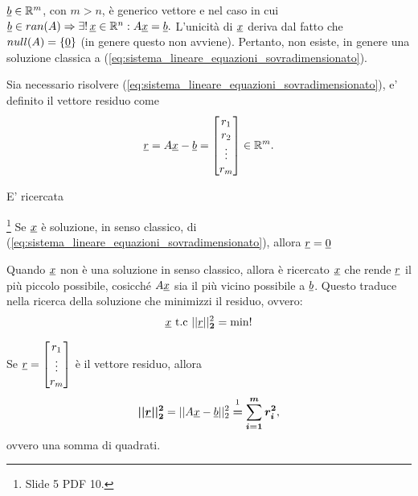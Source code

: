 $\uline b\in\mathbb R^m$, con $m>n$, è generico vettore e nel caso in cui $\uline b\in ran(A)\Rightarrow\exists! \,\uline x\in\mathbb R^n:A\uline x=\uline b.$ L'unicità di $\uline x$ deriva dal fatto che $null(A)=\{\uline 0\}$ (in genere questo non avviene). Pertanto, non esiste, in genere una soluzione classica a (\ref{eq:sistema_lineare_equazioni_sovradimensionato}).

\begin{definition}
	Sia necessario risolvere (\ref{eq:sistema_lineare_equazioni_sovradimensionato}), e' definito il vettore residuo come
	\begin{equation}\label{eq:vettore_residuo}
		\uline r = A\uline x-\uline b=
		\begin{bmatrix}
			r_1\\
			r_2\\
			\vdots\\
			r_m
		\end{bmatrix}
		\in\mathbb R^m.
	\end{equation}
\end{definition}

E' ricercata 

\begin{remark}\footnote{Slide 5 PDF 10.}
    Se $\uline x$ è soluzione, in senso classico, di (\ref{eq:sistema_lineare_equazioni_sovradimensionato}), allora $\uline r=\uline 0$
\end{remark}

Quando $\uline x$ non è una soluzione in senso classico, allora è ricercato $\uline x$ che rende $\uline r$ il più piccolo possibile, cosicché $A\uline x$ sia il più vicino possibile a $\uline b$. Questo traduce nella ricerca della soluzione  che minimizzi il residuo, ovvero:
\begin{equation}\label{eq:normRes}
    \uline x\text{ t.c }||\uline r||_{\boldsymbol 2}^2=\min!
\end{equation}
\begin{remark}
    Se $\uline r=\begin{bmatrix}
        r_1\\
        \vdots\\
        r_m
    \end{bmatrix}$ è il vettore residuo, allora
    \begin{equation}\label{eq:resNorm2}
        \boldsymbol{||\uline r||_2^2} = ||A\uline x - \uline b||_2^2 \overset{\footnotemark}{\boldsymbol =} \boldsymbol{\sum_{i=1}^m r_i^2},
    \end{equation}
    ovvero una somma di quadrati.
\end{remark}

